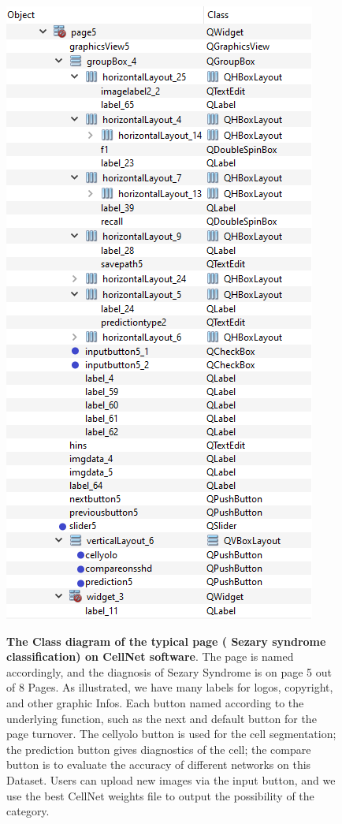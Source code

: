 \begin{figure}[t]
\begin{center}
\includegraphics[height=0.5\textheight]{thesis-template-master/images/tempsnip.png}
\label{fig:cellnet}
\end{center}
\caption{ \textbf{The Class diagram of the typical page ( Sezary syndrome classification) on CellNet software}. The page is named accordingly, and the diagnosis of Sezary Syndrome is on page 5 out of 8 Pages. As illustrated, we have many labels for logos, copyright, and other graphic Infos. Each button named according to the underlying function, such as the next and default button for the page turnover. The cellyolo button is used for the cell segmentation; the prediction button gives diagnostics of the cell; the compare button is to evaluate the accuracy of different networks on this Dataset. Users can upload new images via the input button, and we use the best CellNet weights file to output the possibility of the category.}
\label{fig:6.7}
\end{figure}

